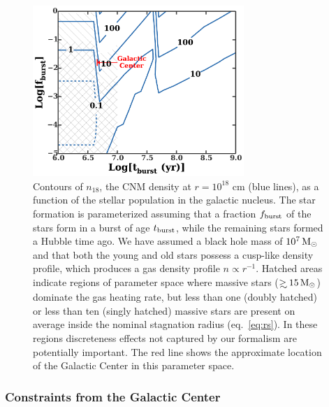\documentclass[usenatbib,fleqn]{mnras}
\newcommand\gsim{\mathrel{\rlap{\lower4pt\hbox{\hskip1pt$\sim$}}
    \raise1pt\hbox{$>$}}}
\newcommand{\Msun}{{\rm M_\odot}}
\begin{document}
\begin{figure} 
  \includegraphics[width=8cm]{cnm_plot.pdf}
  \caption{\label{fig:param} Contours of $n_{18}$, the CNM density at
    $r = 10^{18}$ cm (blue lines), as a function of the stellar
    population in the galactic nucleus.  The star formation is
    parameterized assuming that a fraction $f_{\rm burst}$ of the
    stars form in a burst of age $t_{\rm burst}$, while the remaining
    stars formed a Hubble time ago.  We have assumed a black hole mass
    of $10^{7} \, \Msun$ and that both the young and old stars possess
    a cusp-like density profile, which produces a gas density profile
    $n \propto r^{-1}$.  Hatched areas indicate regions of parameter
    space where massive stars ($\gsim 15 \, \Msun$) dominate the gas
    heating rate, but less than one (doubly hatched) or less than ten
    (singly hatched) massive stars are present on average inside the
    nominal stagnation radius (eq.~\ref{eq:rs}).  In these regions
    discreteness effects not captured by our formalism are potentially
    important. The red line shows the approximate location of the
    Galactic Center in this parameter space.}
\end{figure}



\subsubsection{Constraints from the Galactic Center}
\label{sec:empirical}
\end{document}
